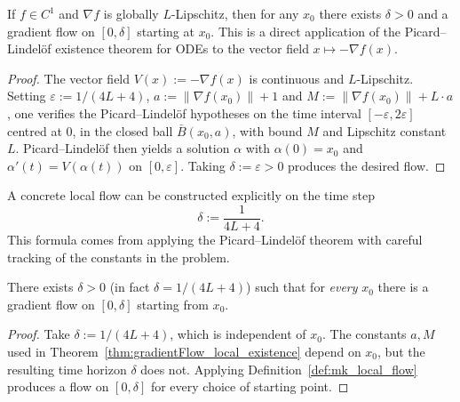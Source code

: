 \begin{theorem}
  \label{thm:gradientFlow_local_existence}
  \leanok{}
  If $f\in C^1$ and $\nabla f$ is globally $L$-Lipschitz, then for any $x_0$ there exists $\delta>0$
  and a gradient flow on $[0,\delta]$ starting at $x_0$.
  This is a direct application of the Picard--Lindelöf existence theorem for ODEs to the vector field $x \mapsto -\nabla f(x)$.
\end{theorem}
\begin{proof}
  \leanok{}
  The vector field $V(x):=-\nabla f(x)$ is continuous and $L$-Lipschitz. Setting $\varepsilon:=1/(4L+4)$,
  $a := \|\nabla f(x_0)\|+1$ and $M := \|\nabla f(x_0)\|+L\cdot a$, one verifies the Picard--Lindel\"of
  hypotheses on the time interval $[-\varepsilon,2\varepsilon]$ centred at $0$, in the closed ball
  $\bar B(x_0,a)$, with bound $M$ and Lipschitz constant $L$. Picard--Lindel\"of then yields a
  solution $\alpha$ with $\alpha(0)=x_0$ and $\alpha'(t)=V(\alpha(t))$ on $[0,\varepsilon]$. Taking
  $\delta:=\varepsilon>0$ produces the desired flow.
\end{proof}

\begin{definition}
  \label{def:mk_local_flow}
  \leanok{}
  A concrete local flow can be constructed explicitly on the time step
  \[
    \delta := \frac{1}{4L+4}.
  \]
  This formula comes from applying the Picard--Lindelöf theorem with careful tracking of the constants in the problem.
\end{definition}

\begin{theorem}
  \label{thm:gradientFlow_local_existence_uniform}
  \leanok{}
  There exists $\delta>0$ (in fact $\delta=1/(4L+4)$) such that for \emph{every} $x_0$
  there is a gradient flow on $[0,\delta]$ starting from $x_0$.
\end{theorem}
\begin{proof}
  \leanok{}
  Take $\delta:=1/(4L+4)$, which is independent of $x_0$. The constants $a,M$ used in
  Theorem~\ref{thm:gradientFlow_local_existence} depend on $x_0$, but the resulting time horizon
  $\delta$ does not. Applying Definition~\ref{def:mk_local_flow} produces a flow on $[0,\delta]$ for
  every choice of starting point.
\end{proof}

